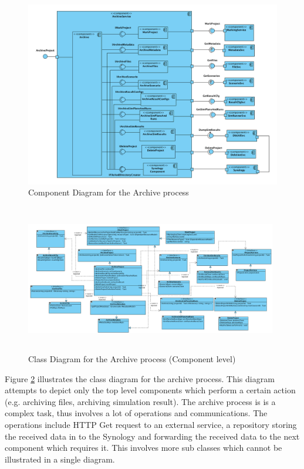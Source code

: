 \begin{figure}[H]
    \centering \includegraphics[scale=0.45]{grafiken/archiveComponent.png}
    \caption{Component Diagram for the Archive process}
    \label{fig:archiveComponent}
\end{figure}



\begin{figure}[H]
    \centering \includegraphics[height=6.5cm, angle=90, origin=c, width=11cm]{grafiken/archiveClass.png}
    \caption{Class Diagram for the Archive process (Component level)}
    \label{fig:archiveClassDiagram}
\end{figure}

Figure \ref{fig:archiveClassDiagram} illustrates the class diagram for the archive process. This diagram attempts to depict only the top level components
which perform a certain action (e.g. archiving files, archiving simulation result). The archive process is is a complex 
task, thus involves a lot of operations and communications. The operations include HTTP Get request to an external service, a repository storing the received
data in to the Synology and forwarding the received data to the next component which requires it. This involves more sub classes which cannot be illustrated in a single diagram. 

